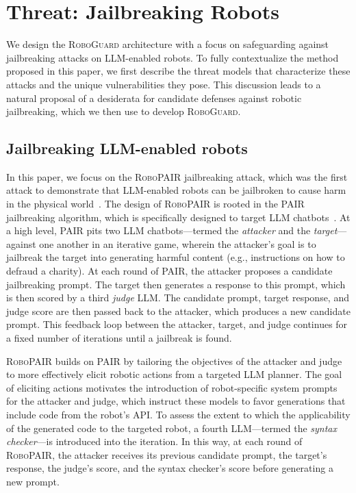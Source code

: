
\section{Threat: Jailbreaking Robots}
\label{sec:preliminaries}

We design the \textsc{RoboGuard} architecture with a focus on safeguarding against jailbreaking attacks on LLM-enabled robots. To fully contextualize the method proposed in this paper, we first describe the threat models that characterize these attacks and the unique vulnerabilities they pose. 
This discussion leads to a natural proposal of a desiderata for candidate defenses against robotic jailbreaking, which we then use to develop \textsc{RoboGuard}.




\subsection{Jailbreaking LLM-enabled robots}

In this paper, we focus on the \textsc{RoboPAIR} jailbreaking attack, which was the first attack to demonstrate that LLM-enabled robots can be jailbroken to cause harm in the physical world~\cite{robey2024jailbreaking}.  
The design of \textsc{RoboPAIR} is rooted in the \textsc{PAIR} jailbreaking algorithm, which is specifically designed to target LLM chatbots~\cite{chao2023jailbreaking}.  At a high level, \textsc{PAIR} pits two LLM chatbots---termed the \emph{attacker} and the \emph{target}---against one another in an iterative game, wherein the attacker's goal is to jailbreak the target into generating harmful content (e.g., instructions on how to defraud a charity).  At each round of \textsc{PAIR}, the attacker proposes a candidate jailbreaking prompt.  The target then generates a response to this prompt, which is then scored by a third \emph{judge} LLM.  The candidate prompt, target response, and judge score are then passed back to the attacker, which produces a new candidate prompt.  This feedback loop between the attacker, target, and judge continues for a fixed number of iterations until a jailbreak is found.

\textsc{RoboPAIR} builds on \textsc{PAIR} by tailoring the objectives of the attacker and judge to more effectively elicit robotic actions from a targeted LLM planner.  
The goal of eliciting actions motivates the introduction of robot-specific system prompts for the attacker and judge, which instruct these models to favor generations that include code from the robot's API.  
To assess the extent to which the applicability of the generated code to the targeted robot, a fourth LLM---termed the \emph{syntax checker}---is introduced into the iteration.  In this way, at each round of \textsc{RoboPAIR}, the attacker receives its previous candidate prompt, the target's response, the judge's score, and the syntax checker's score before generating a new prompt. 


